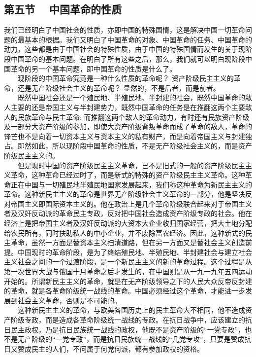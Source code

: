 \documentclass[cn,11pt,chinese]{elegantbook}
\def\myformat#1{\hfil\hfil #1}
\begin{document}
\subsection*{\myformat{第五节 　中国革命的性质}}
我们已经明白了中国社会的性质，亦即中国的特殊国情，这是解决中国一切革命问题的最基本的根据。我们又明白了中国革命的对象、中国革命的任务、中国革命的动力，这些都是由于中国社会的特殊性质，由于中国的特殊国情而发生的关于现阶段中国革命的基本问题。在明白了所有这些之后，那么，我们就可以明白现阶段中国革命的另一个基本问题，即中国革命的性质是什么了。\\
　　现阶段的中国革命究竟是一种什么性质的革命呢？ 资产阶级民主主义的革命，还是无产阶级社会主义的革命呢？ 显然的，不是后者，而是前者。\\
　　既然中国社会还是一个殖民地、半殖民地、半封建的社会，既然中国革命的敌人主要的还是帝国主义与半封建势力，既然中国革命的任务是在推翻这两个主要敌人的民族革命与民主革命; 而推翻这两个敌人的革命动力，有时还有民族资产阶级及一部分大资产阶级的参加，即使大资产阶级背叛革命而成了革命的敌人，革命的锋芒也不是向着一切资本主义与资本主义的私有财产，而是向着帝国主义与封建独占。即然如此，所以现阶段中国革命的性质，不是无产阶级社会主义的，而是资产阶级民主主义的。\\
　　但是现时中国的资产阶级民主主义革命，已不是旧式的一般的资产阶级民主主义革命，这种革命已经过时了，而是新式的特殊的资产阶级民主主义革命。这种革命正在中国与一切殖民地半殖民地国家发展起来，我们称这种革命为新民主主义的革命。这种新民主主义的革命是世界无产阶级社会主义革命的一部分，他是坚决反对帝国主义即国际资本主义的。他在政治上是几个革命阶级联合起来对于帝国主义者及汉奸反动派的革命民主专政，反对把中国社会造成资产阶级专政的社会。他在经济上是把帝国主义者及汉奸反动派的大资本大企业收归国家经营，把大土地分配给农民所有，同时扶助私人的中小企业，并不废除富农经济。因此，这种新式的民主革命，虽然一方面是替资本主义扫清道路，但在另一方面又是替社会主义创造前提。中国现时的革命阶段，是为了终结殖民地、半殖民地、半封建社会与建立社会主义社会之间的一个过渡阶段，是一个新民主主义的新的革命过程。这个过程是从第一次世界大战与俄国十月革命之后才发生的，在中国则是从一九一九年五四运动开始的。所谓新民主主义的革命，就是在无产阶级领导之下的人民大众反帝反封建的革命，就是各革命阶级统一战线的革命。中国必须经过这个革命，才能进一步发展到社会主义革命，否则是不可能的。\\
　　这种新民主主义的革命，与欧美各国历史上的民主革命大不相同，他不造成资产阶级专政，而是造成各革命阶级统一战线的专政。在抗日战争中，应该建立的抗日民主政权，乃是抗日民族统一战线的政权，他既不是资产阶级的“一党专政”，也不是无产阶级的“一党专政”，而是抗日民族统一战线的“几党专攻”，只要是赞成抗日又赞成民主的人们，不问属于何党何派，都有参加政权的资格。\\
\end{document}

